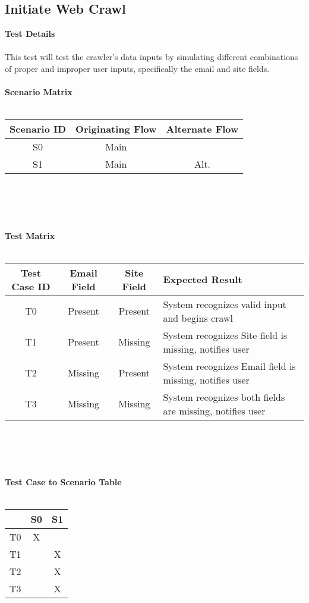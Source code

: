 \subsection{Initiate Web Crawl}
\textbf{Test Details}\\\\
This test will test the crawler's data inputs by simulating different combinations of proper and improper user inputs, specifically the email and site fields.\\\\
\textbf{Scenario Matrix}\\\\
\begin{tabular}{|c|c c|}
	\hline
	Scenario ID & Originating Flow & Alternate Flow  \\ \hline \hline
	S0 & Main &  \\ \hline
	S1 & Main & Alt. \\ \hline
\end{tabular}\\\\\\\\
\textbf{Test Matrix}\\\\
\begin{tabularx}{\textwidth}{|c c c X|}
	\hline
	\textbf{Test Case ID} &\bf{Email Field} & \textbf{Site Field} & \textbf{Expected Result}  \\ \hline
	T0 & Present & Present & System recognizes valid input and begins crawl \\ \hline
	T1 & Present & Missing & System recognizes Site field is missing, notifies user \\ \hline
	T2 & Missing & Present & System recognizes Email field is missing, notifies user  \\ \hline
	T3 & Missing & Missing & System recognizes both fields are missing, notifies user  \\ \hline
\end{tabularx}\\\\\\\\
\textbf{Test Case to Scenario Table}\\\\
\begin{tabular}{|r||c|c|}
	\hline
	& S0 & S1 \\ \hline \hline
	T0 & X & \\ \hline
	T1 & & X \\ \hline
	T2 & & X \\ \hline
	T3 & & X \\ \hline
\end{tabular}

